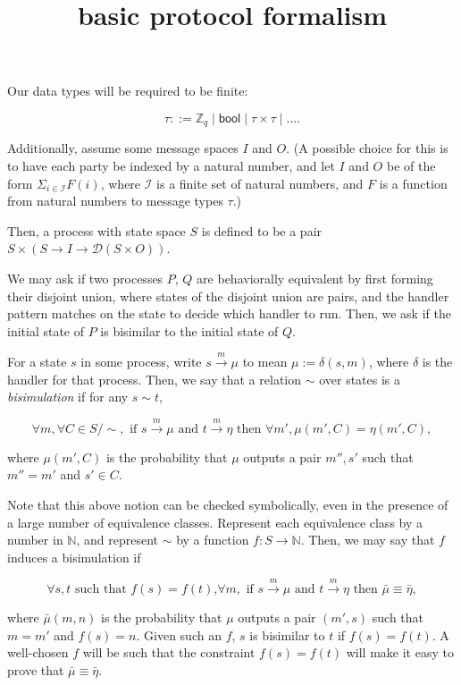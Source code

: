 \documentclass{article}
\title {basic protocol formalism}
\begin{document}
\maketitle

Our data types will be required to be finite:

\[ \tau ::= \mathbb{Z}_{q} \mid \textsf{bool} \mid \tau \times \tau \mid \dots. \]

Additionally, assume some message spaces $I$ and $O$. (A possible choice for this is to have each party be indexed by a natural number, and let $I$ and $O$ be of the form $\Sigma_{i \in \mathcal{I}} F(i)$, where $\mathcal{I}$ is a finite set of natural numbers, and $F$ is a function from natural numbers to message types $\tau$.)

Then, a process with state space $S$ is defined to be a pair $S \times (S \to I \to \mathcal{D}(S \times O))$.

We may ask if two processes $P$, $Q$ are behaviorally equivalent by first forming their disjoint union, where states of the disjoint union are pairs, and the handler pattern matches on the state to decide which handler to run. Then, we ask if the initial state of $P$ is bisimilar to the initial state of $Q$.

For a state $s$ in some process, write $s \xrightarrow{m} \mu$ to mean $\mu := \delta (s,m)$, where $\delta$ is the handler for that process. Then, we say that a relation $\sim$ over states is a \emph{bisimulation} if for any $s \sim t$,

\[ \forall m, \forall C \in S / \sim, \text{ if } s \xrightarrow{m} \mu \text{ and } t \xrightarrow{m} \eta \text{ then }  \forall m', \mu(m',C) = \eta(m',C),\]

where $\mu(m',C)$ is the probability that $\mu$ outputs a pair $m'', s'$ such that $m'' = m'$ and $s' \in C$.


Note that this above notion can be checked symbolically, even in the presence of a large number of equivalence classes. Represent each equivalence class by a number in $\mathbb{N}$, and represent $\sim$ by a function $f : S \to \mathbb{N}$. Then, we may say that $f$ induces a bisimulation if

\[ \forall s,t \text{ such that $f(s) = f(t)$,} \forall m, \text{ if } s \xrightarrow{m} \mu \text{ and } t \xrightarrow{m} \eta \text{ then } \bar{\mu} \equiv \bar{\eta},\]

where $\bar{\mu}(m, n)$ is the probability that $\mu$ outputs a pair $(m', s)$ such that $m = m'$ and $f(s) = n$. Given such an $f$, $s$ is bisimilar to $t$ if $f(s) = f(t)$. A well-chosen $f$ will be such that the constraint $f(s) = f(t)$ will make it easy to prove that $\bar{\mu} \equiv \bar{\eta}$.
\end{document}
